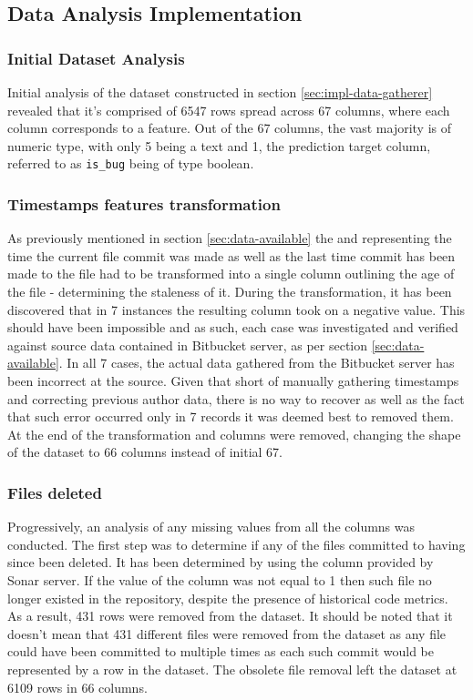\subsection{Data Analysis Implementation}\label{sec:impl-data-analysis}
\subsubsection{Initial Dataset Analysis}
Initial analysis of the dataset constructed in section \ref{sec:impl-data-gatherer} revealed that it's comprised of 6547 rows spread across 67 columns, where each column corresponds to a feature. Out of the 67 columns, the vast majority is of numeric type, with only 5 being a text and 1, the prediction target column, referred to as \texttt{is\_bug} being of type boolean.

\subsubsection{Timestamps features transformation}\label{sec:impl-data-analysis:make-file-age}
As previously mentioned in section \ref{sec:data-available} the \timestamp{} and \prevTimestamp{} representing the time the current file commit was made as well as the last time commit has been made to the file had to be transformed into a single column outlining the age of the file - determining the staleness of it.
During the transformation, it has been discovered that in 7 instances the resulting column took on a negative value. This should have been impossible and as such, each case was investigated and verified against source data contained in Bitbucket server, as per section \ref{sec:data-available}. In all 7 cases, the actual data gathered from the Bitbucket server has been incorrect at the source. Given that short of manually gathering timestamps and correcting previous author data, there is no way to recover as well as the fact that such error occurred only in 7 records it was deemed best to removed them.
At the end of the transformation \timestamp{} and \prevTimestamp{} columns were removed, changing the shape of the dataset to 66 columns instead of initial 67.

\subsubsection{Files deleted}\label{sec:impl-data-analysis:files-deleted}
Progressively, an analysis of any missing values from all the columns was conducted. The first step was to determine if any of the files committed to having since been deleted. It has been determined by using the \files column provided by Sonar server. If the value of the column was not equal to 1 then such file no longer existed in the repository, despite the presence of historical code metrics. As a result, 431 rows were removed from the dataset. It should be noted that it doesn't mean that 431 different files were removed from the dataset as any file could have been committed to multiple times as each such commit would be represented by a row in the dataset. The obsolete file removal left the dataset at 6109 rows in 66 columns.

